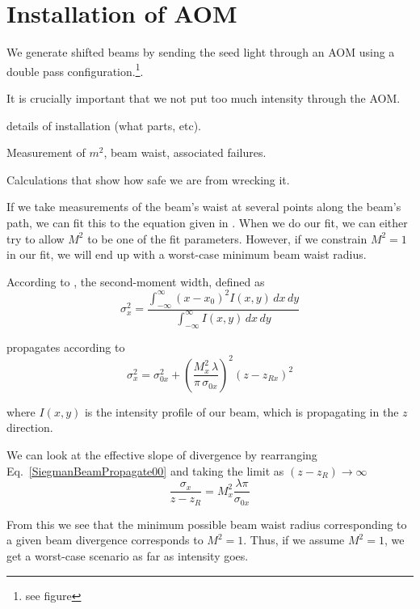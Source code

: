 \section{Installation of AOM}

We generate shifted beams by sending the seed light through an AOM using a double pass configuration.\footnote{see figure}. 

It is crucially important that we not put too much intensity through the AOM. 

details of installation (what parts, etc). 

Measurement of $m^2$, beam waist, associated failures. 

Calculations that show how safe we are from wrecking it. 


If we take measurements of the beam's waist at several points along the beam's path, we can fit this to the equation given in \cite{SiegmanBeamQuality}. When we do our fit, we can either try to allow $M^2$ to be one of the fit parameters. However, if we constrain $M^2=1$ in our fit, we will end up with a worst-case minimum beam waist radius. 

According to \cite{SiegmanBeamQuality}, the second-moment width, defined as 
\begin{equation}
\sigma_x^2=\frac{\int_{-\infty}^{\infty} (x-x_0)^2 I(x,y)\, dx\, dy}{\int_{-\infty}^{\infty} I(x,y)\, dx \, dy}
\end{equation} 

propagates according to 
\begin{equation}
\sigma_x^2=\sigma_{0x}^2+\left( \frac{M_x^2 \,\lambda}{\pi \, \sigma_{0x}}\right)^2 (z-z_{Rx})^2 \label{SiegmanBeamPropagate00}
\end{equation}
 
where $I(x,y)$ is the intensity profile of our beam, which is propagating in the $z$ direction. 

We can look at the effective slope of divergence by rearranging Eq.\ \ref{SiegmanBeamPropagate00} and taking the limit as $(z-z_R) \rightarrow \infty$
\begin{equation}
\frac{\sigma_x}{z-z_R}=M_x^2 \frac{\lambda \pi}{\sigma_{0x}} \label{SiegmanBeamSlope}
\end{equation}

From this we see that the minimum possible beam waist radius corresponding to a given beam divergence corresponds to $M^2=1$. Thus, if we assume $M^2=1$, we get a worst-case scenario as far as intensity goes. 

